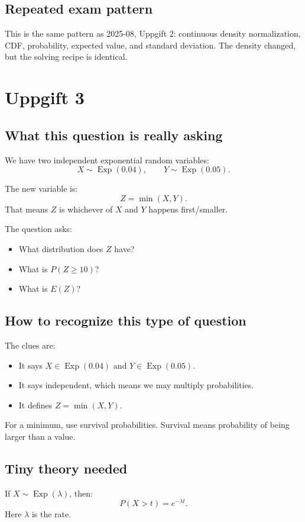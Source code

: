 \documentclass[11pt,a4paper]{article}
\begin{document}
\subsection*{Repeated exam pattern}
This is the same pattern as 2025-08, Uppgift 2: continuous density normalization, CDF, probability, expected value, and standard deviation. The density changed, but the solving recipe is identical.

\section*{Uppgift 3}

\subsection*{What this question is really asking}
We have two independent exponential random variables:
\[
X\sim \operatorname{Exp}(0.04),\qquad Y\sim \operatorname{Exp}(0.05).
\]

The new variable is:
\[
Z=\min(X,Y).
\]
That means \(Z\) is whichever of \(X\) and \(Y\) happens first/smaller.

The question asks:
\begin{itemize}[leftmargin=*]
    \item What distribution does \(Z\) have?
    \item What is \(P(Z\ge 10)\)?
    \item What is \(E(Z)\)?
\end{itemize}

\subsection*{How to recognize this type of question}
The clues are:
\begin{itemize}[leftmargin=*]
    \item It says \(X\in \operatorname{Exp}(0.04)\) and \(Y\in \operatorname{Exp}(0.05)\).
    \item It says independent, which means we may multiply probabilities.
    \item It defines \(Z=\min(X,Y)\).
\end{itemize}

For a minimum, use survival probabilities. Survival means probability of being larger than a value.

\subsection*{Tiny theory needed}
If \(X\sim \operatorname{Exp}(\lambda)\), then:
\[
P(X>t)=e^{-\lambda t}.
\]
Here \(\lambda\) is the rate.
\end{document}
